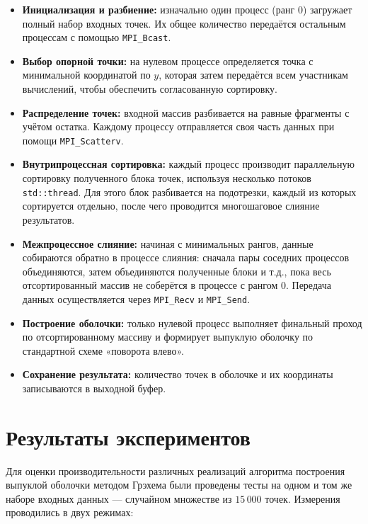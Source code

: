 \documentclass[12pt,a4paper]{extarticle}
\begin{document}
\begin{itemize}
    \item \textbf{Инициализация и разбиение:} изначально один процесс (ранг 0) загружает полный набор входных точек. Их общее количество передаётся остальным процессам с помощью \texttt{MPI\_Bcast}.

    \item \textbf{Выбор опорной точки:} на нулевом процессе определяется точка с минимальной координатой по $y$, которая затем передаётся всем участникам вычислений, чтобы обеспечить согласованную сортировку.

    \item \textbf{Распределение точек:} входной массив разбивается на равные фрагменты с учётом остатка. Каждому процессу отправляется своя часть данных при помощи \texttt{MPI\_Scatterv}.

    \item \textbf{Внутрипроцессная сортировка:} каждый процесс производит параллельную сортировку полученного блока точек, используя несколько потоков \texttt{std::thread}. Для этого блок разбивается на подотрезки, каждый из которых сортируется отдельно, после чего проводится многошаговое слияние результатов.

    \item \textbf{Межпроцессное слияние:} начиная с минимальных рангов, данные собираются обратно в процессе слияния: сначала пары соседних процессов объединяются, затем объединяются полученные блоки и т.д., пока весь отсортированный массив не соберётся в процессе с рангом 0. Передача данных осуществляется через \texttt{MPI\_Recv} и \texttt{MPI\_Send}.

    \item \textbf{Построение оболочки:} только нулевой процесс выполняет финальный проход по отсортированному массиву и формирует выпуклую оболочку по стандартной схеме «поворота влево».

    \item \textbf{Сохранение результата:} количество точек в оболочке и их координаты записываются в выходной буфер.
\end{itemize}

\section{Результаты экспериментов}

Для оценки производительности различных реализаций алгоритма построения выпуклой оболочки методом Грэхема были проведены тесты на одном и том же наборе входных данных — 
случайном множестве из $15\,000$ точек. Измерения проводились в двух режимах:
\end{document}
